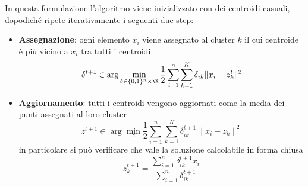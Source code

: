\documentclass{article}
\begin{document}
    In questa formulazione l'algoritmo viene inizializzato con dei centroidi casuali, dopodiché ripete iterativamente i seguenti due step:
    \begin{itemize}
        \item \textbf{Assegnazione}: ogni elemento $x_i$ viene assegnato al cluster $k$ il cui centroide è più vicino a $x_i$ tra tutti i centroidi
        \[\delta^{t+1} \in \arg \min_{\delta \in \{0,1\}^n\times \K} \frac{1}{2} \sum_{i=1}^{n} \sum_{k=1}^{K} \delta_{ik} \|x_i-z_k^{t}\|^2\]
        \item \textbf{Aggiornamento}: tutti i centroidi vengono aggiornati come la media dei punti assegnati al loro cluster
        \[z^{t+1} \in \arg \min_{z} \frac{1}{2} \sum_{i=1}^{n} \sum_{k=1}^{K} \delta_{ik}^{t+1} \|x_i-z_k\|^2\]
        in particolare si può verificare che vale la soluzione calcolabile in forma chiusa
        \[z_k^{t+1} = \frac{\sum_{i=1}^{n} \delta_{ik}^{t+1} x_i}{\sum_{i=1}^{n} \delta_{ik}^{t+1}}\]
    \end{itemize}
\end{document}
